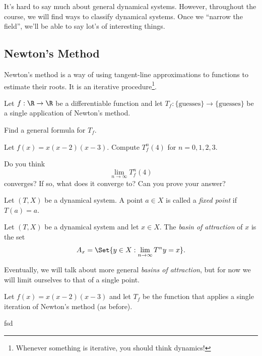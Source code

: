 	It's hard to say much about general dynamical systems.
	However, throughout the course, we will find ways to classify dynamical systems. Once we ``narrow the field'',
	we'll be able to say lot's of interesting things.

	\subsection*{Newton's Method}
	Newton's method is a way of using tangent-line approximations to functions to estimate their roots.
	It is an iterative procedure\footnote{ Whenever something is iterative, you should think dynamics!}.

	\question
	Let $f:\R\to\R$ be a differentiable function and let $T_f:\{\text{guesses}\}\to\{\text{guesses}\}$ be
	a single application of Newton's method.

	\begin{parts}
		\item Find a general formula for $T_f$.
		\item Let $f(x)=x(x-2)(x-3)$. Compute $T_f^n(4)$ for $n=0,1,2,3$.
		\item Do you think
			\[
				\lim_{n\to\infty} T_f^n(4)
			\]
			converges? If so, what does it converge to? Can you prove your answer?
	\end{parts}

	\begin{definition}
		Let $(T,X)$ be a dynamical system. A point $a\in X$ is called a \emph{fixed point} if
		$T(a)=a$.
	\end{definition}

	\begin{definition}
		Let $(T,X)$ be a dynamical system and let $x\in X$. The \emph{basin of attraction}
		of $x$ is the set
		\[
			A_x=\Set{y\in X: \lim_{n\to\infty} T^ny=x}.
		\]
	\end{definition}
	Eventually, we will talk about more general \emph{basins of attraction}, but for now we will limit ourselves to
	that of a single point.

	\question
	Let $f(x)=x(x-2)(x-3)$ and let $T_f$ be the function that applies a single iteration of Newton's method (as before).
	\begin{parts}
		\item fsd
	\end{parts}


